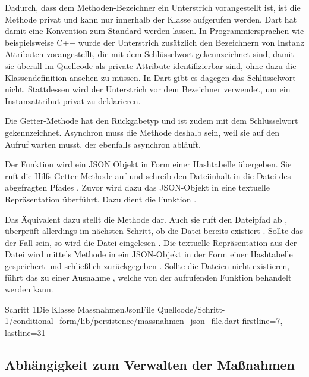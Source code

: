Dadurch, dass dem Methoden-Bezeichner  ein Unterstrich vorangestellt ist, ist die Methode privat und kann nur innerhalb der Klasse aufgerufen werden.
Dart hat damit eine Konvention zum Standard werden lassen.
In Programmiersprachen wie beispielsweise C++ wurde der Unterstrich zusätzlich den Bezeichnern von Instanz Attributen vorangestellt, die mit dem  Schlüsselwort gekennzeichnet sind, damit sie überall im Quellcode als private Attribute identifizierbar sind, ohne dazu die Klassendefinition ansehen zu müssen.
In Dart gibt es dagegen das  Schlüsselwort nicht.
Stattdessen wird der Unterstrich vor dem Bezeichner verwendet, um ein Instanzattribut privat zu deklarieren.

Die Getter-Methode  hat den Rückgabetyp  und ist zudem mit dem Schlüsselwort  gekennzeichnet.
Asynchron muss die Methode deshalb sein, weil sie auf den Aufruf  warten musst, der ebenfalls asynchron abläuft.

Der Funktion   wird ein JSON Objekt in Form einer Hashtabelle übergeben.
Sie ruft die Hilfs-Getter-Methode   auf und schreib den Dateiinhalt in die Datei des abgefragten Pfades .
Zuvor wird dazu das JSON-Objekt in eine textuelle Repräsentation überführt.
Dazu dient die Funktion .

Das Äquivalent dazu stellt die Methode   dar.
Auch sie ruft den Dateipfad ab , überprüft allerdings im nächsten Schritt, ob die Datei bereits existiert .
Sollte das der Fall sein, so wird die Datei eingelesen .
Die textuelle Repräsentation aus der Datei wird mittels Methode  in ein JSON-Objekt in der Form einer Hashtabelle gespeichert  und schließlich zurückgegeben .
Sollte die Dateien nicht existieren, führt das zu einer Ausnahme , welche von der aufrufenden Funktion behandelt werden kann.

\begin{alexlisting}{Schritt 1}{Die Klasse MassnahmenJsonFile}
  {Quellcode/Schritt-1/conditional_form/lib/persistence/massnahmen_json_file.dart}
  {firstline=7, lastline=31}
  \label{lst:Schritt1KlasseMassnahmenJsonFile}
\end{alexlisting}

\ifincludeall \clearpage \fi
\subsection{ Abhängigkeit zum Verwalten der Maßnahmen}


